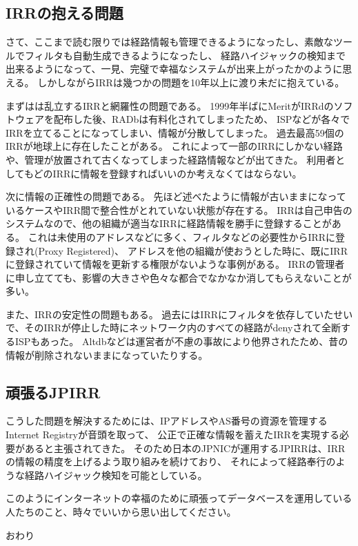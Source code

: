 \subsection{IRRの抱える問題}

さて、ここまで読む限りでは経路情報も管理できるようになったし、素敵なツールでフィルタも自動生成できるようになったし、
経路ハイジャックの検知まで出来るようになって、一見、完璧で幸福なシステムが出来上がったかのように思える。
しかしながらIRRは幾つかの問題を10年以上に渡り未だに抱えている。

まずはは乱立するIRRと網羅性の問題である。
1999年半ばにMeritがIRRdのソフトウェアを配布した後、RADbは有料化されてしまったため、
ISPなどが各々でIRRを立てることになってしまい、情報が分散してしまった。
過去最高59個のIRRが地球上に存在したことがある。
これによって一部のIRRにしかない経路や、管理が放置されて古くなってしまった経路情報などが出てきた。
利用者としてもどのIRRに情報を登録すればいいのか考えなくてはならない。

次に情報の正確性の問題である。
先ほど述べたように情報が古いままになっているケースやIRR間で整合性がとれていない状態が存在する。
IRRは自己申告のシステムなので、他の組織が適当なIRRに経路情報を勝手に登録することがある。
これは未使用のアドレスなどに多く、フィルタなどの必要性からIRRに登録され(Proxy Registered)、
アドレスを他の組織が使おうとした時に、既にIRRに登録されていて情報を更新する権限がないような事例がある。
IRRの管理者に申し立てても、影響の大きさや色々な都合でなかなか消してもらえないことが多い。

また、IRRの安定性の問題もある。
過去にはIRRにフィルタを依存していたせいで、そのIRRが停止した時にネットワーク内のすべての経路がdenyされて全断するISPもあった。
Altdbなどは運営者が不慮の事故により他界されたため、昔の情報が削除されないままになっていたりする。

\subsection{頑張るJPIRR}

こうした問題を解決するためには、IPアドレスやAS番号の資源を管理するInternet Registryが音頭を取って、
公正で正確な情報を蓄えたIRRを実現する必要があると主張されてきた。
そのため日本のJPNICが運用するJPIRRは、IRRの情報の精度を上げるよう取り組みを続けており、
それによって経路奉行のような経路ハイジャック検知を可能としている。

このようにインターネットの幸福のために頑張ってデータベースを運用している人たちのこと、時々でいいから思い出してください。

\begin{flushright}
おわり
\end{flushright}
